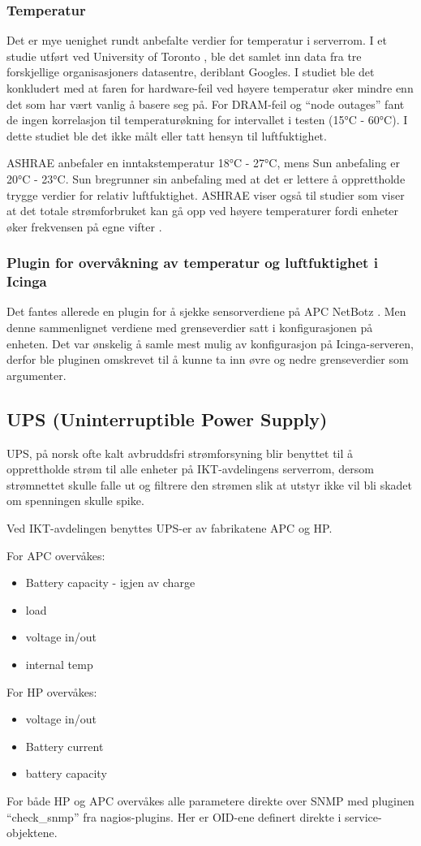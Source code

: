 \subsubsection{Temperatur}

Det er mye uenighet rundt anbefalte verdier for temperatur i serverrom. I et studie utført ved University of Toronto \cite{torontopaper}, ble det samlet inn data fra tre forskjellige organisasjoners datasentre, deriblant Googles. I studiet ble det konkludert med at faren for hardware-feil ved høyere temperatur øker mindre enn det som har vært vanlig å basere seg på. For DRAM-feil og ``node outages'' fant de ingen korrelasjon til temperaturøkning for intervallet i testen (15°C - 60°C). I dette studiet ble det ikke målt eller tatt hensyn til luftfuktighet. 

ASHRAE anbefaler en inntakstemperatur 18°C - 27°C, mens Sun anbefaling er 20°C - 23°C. Sun bregrunner sin anbefaling med at det er lettere å opprettholde trygge verdier for relativ luftfuktighet. ASHRAE viser også til studier som viser at det totale strømforbruket kan gå opp ved høyere temperaturer fordi enheter øker frekvensen på egne vifter \cite{datacentertemp}.

\subsubsection{Plugin for overvåkning av temperatur og luftfuktighet i Icinga}

Det fantes allerede en plugin for å sjekke sensorverdiene på APC NetBotz \cite{checknetbotz}. Men denne sammenlignet verdiene med grenseverdier satt i konfigurasjonen på enheten. Det var ønskelig å samle mest mulig av konfigurasjon på Icinga-serveren, derfor ble pluginen omskrevet til å kunne ta inn øvre og nedre grenseverdier som argumenter.

\subsection{UPS (Uninterruptible Power Supply)}

UPS, på norsk ofte kalt avbruddsfri strømforsyning blir benyttet til å opprettholde strøm til alle enheter på IKT-avdelingens serverrom, dersom strømnettet skulle falle ut og filtrere den strømen slik at utstyr ikke vil bli skadet om spenningen skulle spike.

Ved IKT-avdelingen benyttes UPS-er av fabrikatene APC og HP.

For APC overvåkes:
\begin{itemize}
 	\item Battery capacity - igjen av charge
	\item load
	\item voltage in/out
	\item internal temp
\end{itemize}

For HP overvåkes:
\begin{itemize}
	\item voltage in/out
	\item Battery current
	\item battery capacity
\end{itemize}

For både HP og APC overvåkes alle parametere direkte over SNMP med pluginen “check\_snmp” fra nagios-plugins. Her er OID-ene definert direkte i service-objektene.
